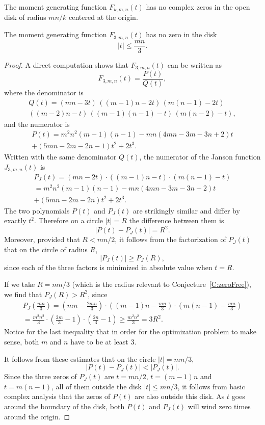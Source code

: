\documentclass[10pt,a4paper]{amsart}
\begin{document}
\begin{Conjecture} \label{C:zeroFree}
The moment generating function $F_{k,m,n}(t)$ has no complex zeros in the open disk of radius $mn/k$ centered at the origin.
\end{Conjecture}

\begin{Prop} \label{P:zeroFree3}
The moment generating function $F_{3,m,n}(t)$ has no zero in the disk \[\left|t\right| \leq \frac{mn}{3}.\]
\end{Prop}

\begin{proof}
A direct computation shows that $F_{3, m, n}(t)$ can be written as
\[ F_{3,m,n}(t) = \frac{P(t)}{Q(t)},\] where the denominator is 
\begin{multline} 
Q(t) = (mn-3t)\,((m-1)n - 2t) \, (m(n-1)-2t) \\ 
((m-2)n-t) \, ((m-1)(n-1) - t) \, (m(n-2) - t),
\end{multline}
and the numerator is 
\begin{multline} P(t) = m^2n^2(m-1)(n-1)
-mn(4mn-3m-3n+2)t \\
+ (5mn-2m-2n-1)t^2 + 2t^3.
\end{multline}
Written with the same denominator $Q(t)$, the numerator of the Janson function $J_{3, m, n}(t)$ is
\begin{multline}
P_J(t) = (mn-2t)\cdot ((m-1)n-t)\cdot (m(n-1)-t) \\
= m^2n^2(m-1)(n-1)-mn(4mn-3m-3n+2)t \\ + (5mn-2m-2n)t^2 + 2t^3.
\end{multline} 
The two polynomials $P(t)$ and $P_J(t)$ are strikingly similar and differ by exactly $t^2$. Therefore on a circle $\left|t\right| = R$ the difference between them is
\[ \left| P(t) - P_J(t)\right| = R^2.\]
Moreover, provided that $R<mn/2$, it follows from the factorization of $P_J(t)$ that on the circle of radius $R$,
\[\left|P_J(t)\right| \geq P_J(R),\] 
since each of the three factors is minimized in absolute value when $t=R$.

If we take $R=mn/3$ (which is the radius relevant to Conjecture~\ref{C:zeroFree}), we find that $P_J(R)>R^2$, since
\begin{multline}  
P_J\left(\frac{mn}3\right)
= \left(mn-\frac{2mn}3\right)\cdot \left((m-1)n-\frac{mn}3\right) \cdot \left(m(n-1)-\frac{mn}3\right) \\
= \frac{m^2n^2}3\cdot\left(\frac{2m}{3}-1\right) \cdot \left(\frac{2n}3-1\right) \geq \frac{m^2n^2}3 = 3R^2.
\end{multline} 
Notice for the last inequality that in order for the optimization problem to make sense, both $m$ and $n$ have to be at least 3.

It follows from these estimates that on the circle $\left|t\right| = mn/3$, 
\[ \left| P(t) - P_J(t)\right| <  \left| P_J(t)\right|.\] 
Since the three zeros of $P_J(t)$ are $t=mn/2$, $t=(m-1)n$ and $t=m(n-1)$, all of them outside the disk $\left|t\right| \leq mn/3$, it follows from basic complex analysis that the zeros of $P(t)$ are also outside this disk. As $t$ goes around the boundary of the disk, both $P(t)$ and $P_J(t)$ will wind zero times around the origin.  
\end{proof}
\end{document}
